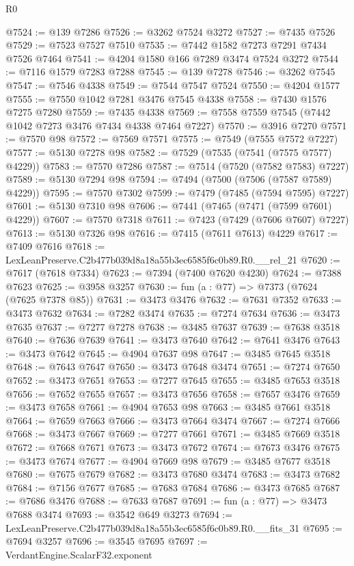 \begin{lexlean}{R0}
\begin{coremodule}
@7524 := @139 @7286
@7526 := @3262 @7524 @3272
@7527 := @7435 @7526
@7529 := @7523 @7527 @7510
@7535 := @7442 @1582 @7273 @7291 @7434 @7526 @7464
@7541 := @4204 @1580 @166 @7289 @3474 @7524 @3272
@7544 := @7116 @1579 @7283 @7288
@7545 := @139 @7278
@7546 := @3262 @7545
@7547 := @7546 @4338
@7549 := @7544 @7547 @7524
@7550 := @4204 @1577
@7555 := @7550 @1042 @7281 @3476 @7545 @4338
@7558 := @7430 @1576 @7275 @7280
@7559 := @7435 @4338
@7569 := @7558 @7559 @7545 (@7442 @1042 @7273 @3476 @7434 @4338 @7464 @7227)
@7570 := @3916 @7270
@7571 := @7570 @98
@7572 := @7569 @7571
@7575 := @7549 (@7555 @7572 @7227)
@7577 := @5130 @7278 @98
@7582 := @7529 (@7535 (@7541 (@7575 @7577) @4229))
@7583 := @7570 @7286
@7587 := @7514 (@7520 (@7582 @7583) @7227)
@7589 := @5130 @7294 @98
@7594 := @7494 (@7500 (@7506 (@7587 @7589) @4229))
@7595 := @7570 @7302
@7599 := @7479 (@7485 (@7594 @7595) @7227)
@7601 := @5130 @7310 @98
@7606 := @7441 (@7465 (@7471 (@7599 @7601) @4229))
@7607 := @7570 @7318
@7611 := @7423 (@7429 (@7606 @7607) @7227)
@7613 := @5130 @7326 @98
@7616 := @7415 (@7611 @7613) @4229
@7617 := @7409 @7616
@7618 := LexLeanPreserve.C2b477b039d8a18a55b3ec6585f6c0b89.R0.__rel_21
@7620 := @7617 (@7618 @7334)
@7623 := @7394 (@7400 @7620 @4230)
@7624 := @7388 @7623
@7625 := @3958 @3257
@7630 := fun (a : @77) => @7373 (@7624 (@7625 @7378 @85))
@7631 := @3473 @3476
@7632 := @7631 @7352
@7633 := @3473 @7632
@7634 := @7282 @3474
@7635 := @7274 @7634
@7636 := @3473 @7635
@7637 := @7277 @7278
@7638 := @3485 @7637
@7639 := @7638 @3518
@7640 := @7636 @7639
@7641 := @3473 @7640
@7642 := @7641 @3476
@7643 := @3473 @7642
@7645 := @4904 @7637 @98
@7647 := @3485 @7645 @3518
@7648 := @7643 @7647
@7650 := @3473 @7648 @3474
@7651 := @7274 @7650
@7652 := @3473 @7651
@7653 := @7277 @7645
@7655 := @3485 @7653 @3518
@7656 := @7652 @7655
@7657 := @3473 @7656
@7658 := @7657 @3476
@7659 := @3473 @7658
@7661 := @4904 @7653 @98
@7663 := @3485 @7661 @3518
@7664 := @7659 @7663
@7666 := @3473 @7664 @3474
@7667 := @7274 @7666
@7668 := @3473 @7667
@7669 := @7277 @7661
@7671 := @3485 @7669 @3518
@7672 := @7668 @7671
@7673 := @3473 @7672
@7674 := @7673 @3476
@7675 := @3473 @7674
@7677 := @4904 @7669 @98
@7679 := @3485 @7677 @3518
@7680 := @7675 @7679
@7682 := @3473 @7680 @3474
@7683 := @3473 @7682
@7684 := @7156 @7677
@7685 := @7683 @7684
@7686 := @3473 @7685
@7687 := @7686 @3476
@7688 := @7633 @7687
@7691 := fun (a : @77) => @3473 @7688 @3474
@7693 := @3542 @649 @3273
@7694 := LexLeanPreserve.C2b477b039d8a18a55b3ec6585f6c0b89.R0.__fits_31
@7695 := @7694 @3257
@7696 := @3545 @7695
@7697 := VerdantEngine.ScalarF32.exponent

\end{coremodule}
\end{lexlean}
